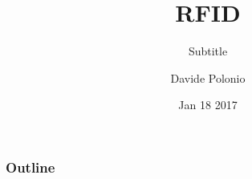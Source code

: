 \documentclass{beamer}
\title{RFID} %
\subtitle{\newline Subtitle}
\author{Davide Polonio}
\date{Jan 18 2017}
\institute{University of Padova}
\begin{document}
\begin{frame}[noframenumbering]
\titlepage
\end{frame}
\let\turnOffNumbers\empty
\begin{frame}
	\frametitle{Outline}
	\tableofcontents
\end{frame}



\makethanks
\end{document}
